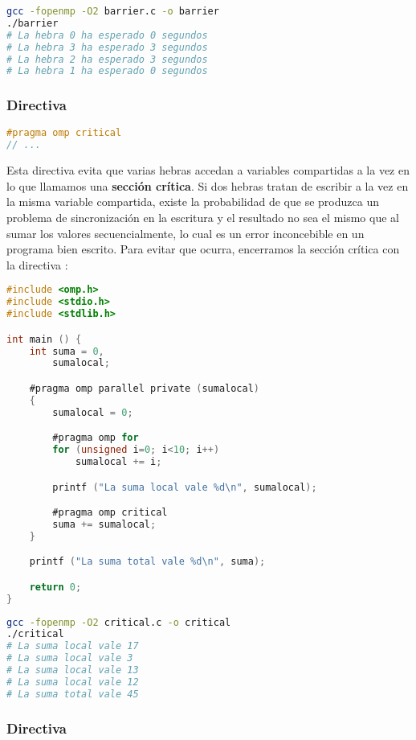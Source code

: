 \begin{lstlisting}[language=sh]
gcc -fopenmp -O2 barrier.c -o barrier
./barrier
# La hebra 0 ha esperado 0 segundos
# La hebra 3 ha esperado 3 segundos
# La hebra 2 ha esperado 3 segundos
# La hebra 1 ha esperado 0 segundos
\end{lstlisting}

\subsubsection{Directiva }

\begin{lstlisting}[language=C]
#pragma omp critical
// ...
\end{lstlisting}

Esta directiva evita que varias hebras accedan a variables compartidas a la vez en lo que llamamos una \textbf{sección crítica}.
Si dos hebras tratan de escribir a la vez en la misma variable compartida, existe la probabilidad de que se produzca un problema de sincronización en la escritura y el resultado no sea el mismo que al sumar los valores secuencialmente, lo cual es un error inconcebible en un programa bien escrito.
Para evitar que ocurra, encerramos la sección crítica con la directiva :

\begin{lstlisting}[language=C]
#include <omp.h>
#include <stdio.h>
#include <stdlib.h>

int main () {
	int suma = 0,
	    sumalocal;

	#pragma omp parallel private (sumalocal)
	{
		sumalocal = 0;

		#pragma omp for
		for (unsigned i=0; i<10; i++)
			sumalocal += i;

		printf ("La suma local vale %d\n", sumalocal);

		#pragma omp critical
		suma += sumalocal;
	}

	printf ("La suma total vale %d\n", suma);

	return 0;
}
\end{lstlisting}

\begin{lstlisting}[language=sh]
gcc -fopenmp -O2 critical.c -o critical
./critical
# La suma local vale 17
# La suma local vale 3
# La suma local vale 13
# La suma local vale 12
# La suma total vale 45
\end{lstlisting}

\subsubsection{Directiva }

